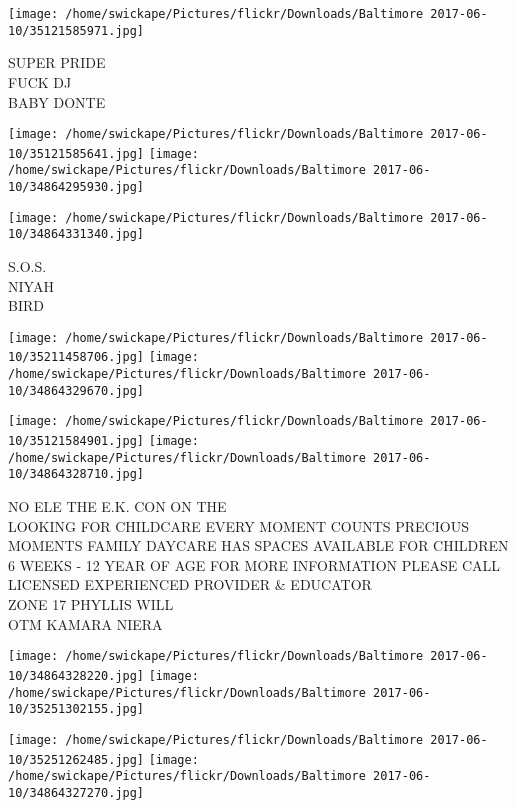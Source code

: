 \documentclass[10pt,letterpaper]{article}
\begin{document}
\vspace{0.25in}
\texttt{[image: /home/swickape/Pictures/flickr/Downloads/Baltimore 2017-06-10/35121585971.jpg]}

SUPER PRIDE\\
FUCK DJ\\
BABY DONTE\\
\pagebreak

\texttt{[image: /home/swickape/Pictures/flickr/Downloads/Baltimore 2017-06-10/35121585641.jpg]}
\texttt{[image: /home/swickape/Pictures/flickr/Downloads/Baltimore 2017-06-10/34864295930.jpg]}

\vspace{0.25in}
\texttt{[image: /home/swickape/Pictures/flickr/Downloads/Baltimore 2017-06-10/34864331340.jpg]}

S.O.S.\\
NIYAH\\
BIRD\\
\pagebreak

\texttt{[image: /home/swickape/Pictures/flickr/Downloads/Baltimore 2017-06-10/35211458706.jpg]}
\texttt{[image: /home/swickape/Pictures/flickr/Downloads/Baltimore 2017-06-10/34864329670.jpg]}

\texttt{[image: /home/swickape/Pictures/flickr/Downloads/Baltimore 2017-06-10/35121584901.jpg]}
\texttt{[image: /home/swickape/Pictures/flickr/Downloads/Baltimore 2017-06-10/34864328710.jpg]}

NO ELE THE E.K. CON ON THE\\
LOOKING FOR CHILDCARE EVERY MOMENT COUNTS PRECIOUS MOMENTS FAMILY DAYCARE HAS SPACES AVAILABLE FOR CHILDREN 6 WEEKS {-} 12 YEAR OF AGE FOR MORE INFORMATION PLEASE CALL LICENSED EXPERIENCED PROVIDER \& EDUCATOR\\
ZONE 17 PHYLLIS WILL\\
OTM KAMARA NIERA\\
\pagebreak

\texttt{[image: /home/swickape/Pictures/flickr/Downloads/Baltimore 2017-06-10/34864328220.jpg]}
\texttt{[image: /home/swickape/Pictures/flickr/Downloads/Baltimore 2017-06-10/35251302155.jpg]}

\texttt{[image: /home/swickape/Pictures/flickr/Downloads/Baltimore 2017-06-10/35251262485.jpg]}
\texttt{[image: /home/swickape/Pictures/flickr/Downloads/Baltimore 2017-06-10/34864327270.jpg]}
\end{document}

